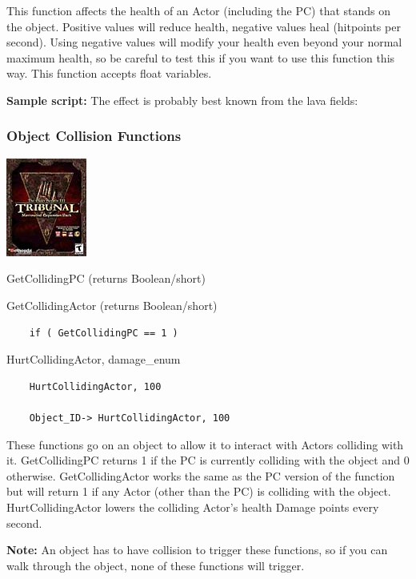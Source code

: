 This function affects the health of an Actor (including the PC) that
stands on the object. Positive values will reduce health, negative
values heal (hitpoints per second). Using negative values will modify
your health even beyond your normal maximum health, so be careful to
test this if you want to use this function this way. This function
accepts float variables.

\textbf{Sample script:} The effect is probably best known from the lava
fields:



\hypertarget{object-collision-functions}{%
\subsubsection{Object Collision
Functions}\label{object-collision-functions}}

\includegraphics{media/image6.png}

GetCollidingPC (returns Boolean/short)

GetCollidingActor (returns Boolean/short)

\begin{lstlisting}
	if ( GetCollidingPC == 1 )
\end{lstlisting}

HurtCollidingActor, damage\_enum

\begin{lstlisting}
	HurtCollidingActor, 100
	
	Object_ID-> HurtCollidingActor, 100
\end{lstlisting}

These functions go on an object to allow it to interact with Actors
colliding with it. GetCollidingPC returns 1 if the PC is currently
colliding with the object and 0 otherwise. GetCollidingActor works the
same as the PC version of the function but will return 1 if any Actor
(other than the PC) is colliding with the object. HurtCollidingActor
lowers the colliding Actor's health Damage points every second.

\textbf{Note:} An object has to have collision to trigger these
functions, so if you can walk through the object, none of these
functions will trigger.

